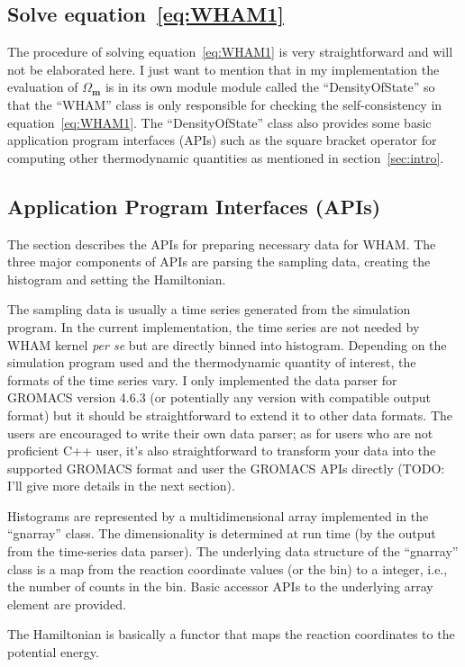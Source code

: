 \subsection{Solve equation~\ref{eq:WHAM1}}
The procedure of solving equation~\ref{eq:WHAM1} is very straightforward and
will not be elaborated here. I just want to mention that in my implementation
the evaluation of $\Omega_{\mathbf{m}}$ is in its own module module called the
``DensityOfState'' so that the ``WHAM'' class is only responsible for checking
the self-consistency in equation~\ref{eq:WHAM1}.  The ``DensityOfState'' class
also provides some basic application program interfaces (APIs) such as the
square bracket operator for computing other thermodynamic quantities as
mentioned in section~\ref{sec:intro}.

\subsection{Application Program Interfaces (APIs)}
The section describes the APIs for preparing necessary data for WHAM. The three
major components of APIs are parsing the sampling data, creating the histogram 
and setting the Hamiltonian. 

The sampling data is usually a time series generated from the simulation
program. In the current implementation, the time series are not needed by WHAM
kernel \textit{per se} but are directly binned into histogram. Depending on the
simulation program used and the thermodynamic quantity of interest, the formats
of the time series vary. I only implemented the data parser for GROMACS version
4.6.3 (or potentially any version with compatible output format) but it should
be straightforward to extend it to other data formats.  The users are
encouraged to write their own data parser; as for users who are not proficient
C++ user, it's also straightforward to transform your data into the supported
GROMACS format and user the GROMACS APIs directly (TODO: I'll give more details
in the next section).

Histograms are represented by a multidimensional array implemented in the
``gnarray'' class. The dimensionality is determined at run time (by the output 
from the time-series data parser). The underlying data structure of the 
``gnarray'' class is a map from the reaction coordinate values (or the bin)
to a integer, i.e., the number of counts in the bin. Basic accessor APIs
to the underlying array element are provided.

The Hamiltonian is basically a functor that maps the reaction coordinates 
to the potential energy. 

